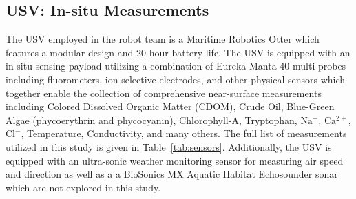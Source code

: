 \documentclass[journal,article,submit,pdftex,moreauthors]{Definitions/mdpi}
\begin{document}
\subsection{USV: In-situ Measurements}

The USV employed in the robot team is a Maritime Robotics Otter which features a modular design and 20 hour battery life. The USV is equipped with an in-situ sensing payload utilizing a combination of Eureka Manta-40 multi-probes including fluorometers, ion selective electrodes, and other physical sensors which together enable the collection of comprehensive near-surface measurements including Colored Dissolved Organic Matter (CDOM), Crude Oil, Blue-Green Algae (phycoerythrin and phycocyanin), Chlorophyll-A, Tryptophan, $\mathrm{Na^+}$, $\mathrm{Ca^{2+}}$, $\mathrm{Cl^-}$, Temperature, Conductivity, and many others. The full list of measurements utilized in this study is given in Table~\ref{tab:sensors}. Additionally, the USV is equipped with an ultra-sonic weather monitoring sensor for measuring air speed and direction as well as a a BioSonics MX Aquatic Habitat Echosounder sonar which are not explored in this study.

\end{document}
